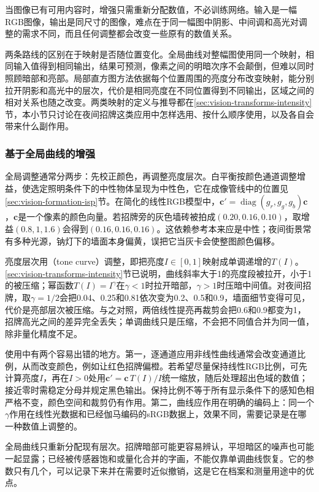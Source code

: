 当图像已有可用内容时，增强只需重新分配数值，不必训练网络。输入是一幅RGB图像，输出是同尺寸的图像，难点在于同一幅图中阴影、中间调和高光对调整的需求不同，而且任何调整都会改变一些原有的数值关系。

两条路线的区别在于映射是否随位置变化。全局曲线对整幅图使用同一个映射，相同输入值得到相同输出，结果可预测，像素之间的明暗次序不会颠倒，但难以同时照顾暗部和亮部。局部直方图方法依据每个位置周围的亮度分布改变映射，能分别拉开阴影和高光中的层次，代价是相同亮度在不同位置得到不同输出，区域之间的相对关系也随之改变。两类映射的定义与推导都在\ref{sec:vision-transforms-intensity}节，本小节只讨论在夜间招牌这类应用中怎样选用、按什么顺序使用，以及各自会带来什么副作用。

\subsubsection{基于全局曲线的增强}
\label{sec:vision-restoration-white-balance}

全局调整通常分两步：先校正颜色，再调整亮度层次。白平衡按颜色通道调整增益，使选定照明条件下的中性物体呈现为中性色，它在成像管线中的位置见\ref{sec:vision-formation-isp}节。在简化的线性RGB模型中，$\bm{c}'=\operatorname{diag}(g_r,g_g,g_b)\bm{c}$，$\bm{c}$是一个像素的颜色向量。若招牌旁的灰色墙砖被拍成$(0.20,0.16,0.10)$，取增益$(0.8,1,1.6)$会得到$(0.16,0.16,0.16)$。这依赖参考本来应是中性；夜间街景常有多种光源，钠灯下的墙面本身偏黄，误把它当灰卡会使整图颜色偏移。

亮度层次用（tone curve）调整，即把亮度$I\in[0,1]$映射成单调递增的$T(I)$。\ref{sec:vision-transforms-intensity}节已说明，曲线斜率大于1的亮度段被拉开，小于1的被压缩；幂函数$T(I)=I^\gamma$在$\gamma<1$时拉开暗部，$\gamma>1$时压暗中间值。对夜间招牌，取$\gamma=1/2$会把0.04、0.25和0.81依次变为0.2、0.5和0.9，墙面细节变得可见，代价是亮部层次被压缩。与之对照，两倍线性提亮再裁剪会把0.6和0.9都变为1，招牌高光之间的差异完全丢失；单调曲线只是压缩，不会把不同值合并为同一值，除非量化精度不足。

使用中有两个容易出错的地方。第一，逐通道应用非线性曲线通常会改变通道比例，从而改变颜色，例如让红色招牌偏橙。若希望尽量保持线性RGB比例，可先计算亮度$I$，再在$I>0$处用$\bm{c}'=\bm{c}\,T(I)/I$统一缩放，随后处理超出色域的数值；接近零时需稳定分母并规定黑色输出。保持比例不等于所有显示条件下的感知色相严格不变，颜色空间和裁剪仍有作用。第二，曲线应作用在明确的编码上：同一个$\gamma$作用在线性光数据和已经伽马编码的sRGB数据上，效果不同，需要记录是在哪一种数值上调整的。

全局曲线只重新分配现有层次。招牌暗部可能更容易辨认，平坦暗区的噪声也可能一起显露；已经被传感器饱和或量化合并的字画，不能仅靠单调曲线恢复。它的参数只有几个，可以记录下来并在需要时近似撤销，这是它在档案和测量用途中的优点。

